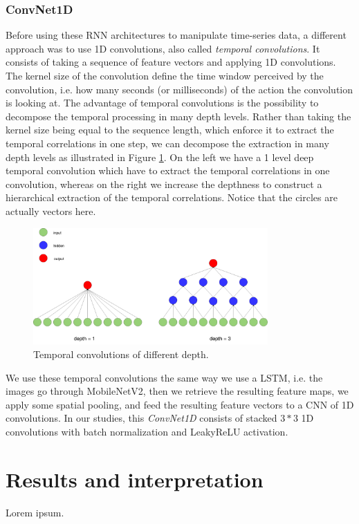 \documentclass[12pt, a4paper]{report}
\begin{document}
				\subsubsection{ConvNet1D}
					Before using these RNN architectures to manipulate time-series data, a different approach was to use 1D convolutions, also called {\itshape temporal convolutions}.
					It consists of taking a sequence of feature vectors and applying 1D convolutions.
					The kernel size of the convolution define the time window perceived by the convolution, i.e. how many seconds (or milliseconds) of the action the convolution is looking at.
					The advantage of temporal convolutions is the possibility to decompose the temporal processing in many depth levels.
					Rather than taking the kernel size being equal to the sequence length, which enforce it to extract the temporal correlations in one step, we can decompose the extraction in many depth levels as illustrated in Figure \ref{temp_conv}.
					On the left we have a 1 level deep temporal convolution which have to extract the temporal correlations in one convolution, whereas on the right we increase the depthness to construct a hierarchical extraction of the temporal correlations.
					Notice that the circles are actually vectors here.
					\begin{figure}[h!]
						\centering
						\includegraphics[width=0.8\textwidth]{temporal_convolution.png}
						\caption{Temporal convolutions of different depth.}\label{temp_conv}
					\end{figure}
					\par
					We use these temporal convolutions the same way we use a LSTM, i.e. the images go through MobileNetV2, then we retrieve the resulting feature maps, we apply some spatial pooling, and feed the resulting feature vectors to a CNN of 1D convolutions.
					In our studies, this {\itshape ConvNet1D} consists of stacked $3*3$ 1D convolutions with batch normalization and LeakyReLU activation.
		\section{Results and interpretation}
			Lorem ipsum.
\end{document}
